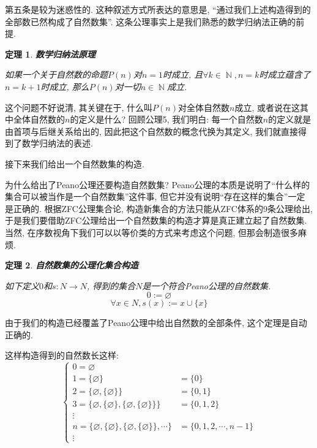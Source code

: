 \documentclass[UTF8]{ctexart}
\newcommand{\<}{\langle}
\renewcommand{\>}{\rangle}
\DeclareMathOperator{\N}{\mathbb{N}}
\newtheorem{thm}{定理}[subsection]
\begin{document}
            第五条是较为迷惑性的. 这种叙述方式所表达的意思是, ``通过我们上述构造得到的全部数已然构成了自然数集''. 这条公理事实上是我们熟悉的数学归纳法正确的前提. 
            
            \begin{thm}
                \textbf{数学归纳法原理}

                如果一个关于自然数的命题$P(n)$对$n=1$时成立, 且$\forall k\in\N, n=k$时成立蕴含了$n=k+1$时成立, 那么$P(n)$对一切$n\in\N$成立. 
            \end{thm}

            这个问题不好说清, 其关键在于, 什么叫$P(n)$对全体自然数$n$成立, 或者说在这其中全体自然数的$n$的定义是什么? 回顾公理5, 我们明白: 每一个自然数$n$的定义就是由首项与后继关系给出的, 因此把这个自然数的概念代换为其定义, 我们就直接得到了数学归纳法的表述. 

            接下来我们给出一个自然数集的构造. 

            为什么给出了Peano公理还要构造自然数集? Peano公理的本质是说明了``什么样的集合可以被当作是一个自然数集''这件事, 但它并没有说明``存在这样的集合''一定是正确的. 根据ZFC公理集合论, 构造新集合的方法只能从ZFC体系的9条公理给出, 于是我们要借助ZFC公理给出一个自然数集的构造才算是真正建立起了自然数集. 当然, 在序数视角下我们可以以等价类的方式来考虑这个问题, 但那会制造很多麻烦. 
            
            \begin{thm}
                \textbf{自然数集的公理化集合构造}

                如下定义$0$和$s:N\to N$, 得到的集合$N$是一个符合Peano公理的自然数集. 
                \[0:=\varnothing\]
                \[\forall x\in N, s(x):=x\cup\{x\}\]
            \end{thm}

            由于我们的构造已经覆盖了Peano公理中给出自然数的全部条件, 这个定理是自动正确的. 

            这样构造得到的自然数长这样: 
            \[\begin{cases}
                0=\varnothing\\
                1=\{\varnothing\} & =\{0\}\\
                2=\{\varnothing,\{\varnothing\}\} & =\{0,1\}\\
                3=\{\varnothing,\{\varnothing\},\{\varnothing,\{\varnothing\}\}\} & =\{0,1,2\}\\
                \vdots\\
                n=\{\varnothing,\{\varnothing\},\{\varnothing,\{\varnothing\}\},\cdots\} & =\{0,1,2,\cdots,n-1\}\\
                \vdots
            \end{cases}\]
\end{document}

